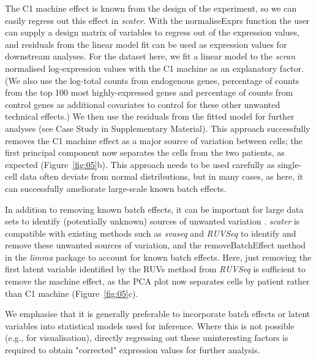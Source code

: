 \documentclass{bioinfo}
\begin{document}
The C1 machine effect is known from the design of the experiment, so we
can easily regress out this effect in \emph{scater}. With the
normaliseExprs function the user can supply a design matrix of variables
to regress out of the expression values, and residuals from the linear
model fit can be used as expression values for downstream analyses. For
the dataset here, we fit a linear model to the \emph{scran} normalised
log-expression values with the C1 machine as an explanatory factor. (We
also use the log-total counts from endogenous genes, percentage of
counts from the top 100 most highly-expressed genes and percentage of
counts from control genes as additional covariates to control for these other unwanted technical effects.) We then use the
residuals from the fitted model for further analyses (see Case Study in
Supplementary Material). This approach successfully removes the C1
machine effect as a major source of variation between cells; the first
principal component now separates the cells from the two patients, as
expected (Figure~\ref{fig:05}b). This approach needs to be used carefully
as single-cell data often deviate from normal distributions, but in many
cases, as here, it can successfully ameliorate large-scale known batch
effects.

In addition to removing known batch effects, it can be important for
large data sets to identify (potentially unknown) sources of unwanted variation
\citep{Leek2010-nq,Hicks2015-qy,Tung2016-jy,Bacher2016-ay,Grun2015-xi}.
\emph{scater} is compatible with existing methods such as \emph{svaseq}
\citep{Leek2007-rg,Leek2014-nu} and \emph{RUVSeq} \citep{Risso2014-np} to
identify and remove these unwanted sources of variation, and the
removeBatchEffect method in the \emph{limma} package \citep{Ritchie2015-so}
to account for known batch effects. Here, just removing the first latent
variable identified by the RUVs method from \emph{RUVSeq} is sufficient to
remove the machine effect, as the PCA plot now separates cells by patient
rather than C1 machine (Figure~\ref{fig:05}c).


We emphasise that it is generally preferable to incorporate batch effects or latent variables into statistical models used for inference. Where this is not possible (e.g., for visualisation), directly regressing out these uninteresting factors is required to obtain "corrected" expression values for further analysis.
\end{document}
